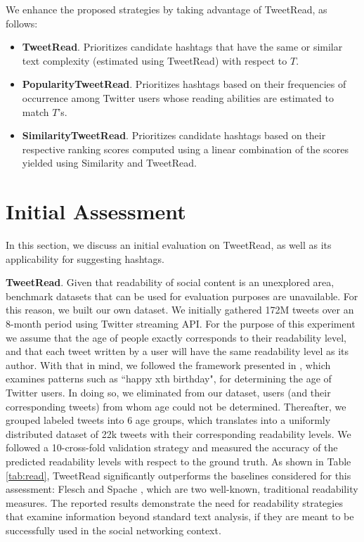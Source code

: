 \documentclass{sig-alternate-05-2015}
\begin{document}
We enhance the proposed strategies by taking advantage of TweetRead, as follows:
\begin{itemize}
\item \textbf{TweetRead}. Prioritizes candidate hashtags that have the same or similar text complexity (estimated using TweetRead) with respect to $T$.
\item \textbf{PopularityTweetRead}. Prioritizes hashtags based on their frequencies of occurrence among Twitter users whose reading abilities are estimated to match $T$'s.
\item \textbf{SimilarityTweetRead}. Prioritizes candidate hashtags based on their respective ranking scores computed using a linear combination of the scores yielded using Similarity and TweetRead. 
\end{itemize}

\section{Initial Assessment}
In this section, we discuss an initial evaluation on TweetRead, as well as its applicability for suggesting hashtags.

\textbf{TweetRead}. Given that readability of social content is an unexplored area, benchmark datasets that can be used for evaluation purposes are unavailable. For this reason, we built our own dataset. We initially gathered 172M tweets over an 8-month period using Twitter streaming API. For the purpose of this experiment we assume that the age of people exactly corresponds to their readability level, and that each tweet written by a user will have the same readability level as its author. With that in mind, we followed the framework presented in \cite{age}, which examines patterns such as ``happy xth birthday", for determining the age of Twitter users. In doing so, we eliminated from our dataset, users (and their corresponding tweets) from whom age  could not be determined. Thereafter, we grouped labeled tweets into 6 age groups, which translates into a uniformly distributed dataset of 22k tweets with their corresponding readability levels. %
We followed a 10-cross-fold validation strategy and measured the accuracy of the predicted readability levels with respect to the ground truth. 
As shown in Table \ref{tab:read}, TweetRead significantly outperforms the baselines considered for this assessment: Flesch \cite{Fle48} and Spache \cite{spache1953new}, which are two well-known, traditional readability measures. The reported results demonstrate the need for readability strategies that examine information beyond standard text analysis, if they are meant to be successfully used in the social networking context.
\end{document}
